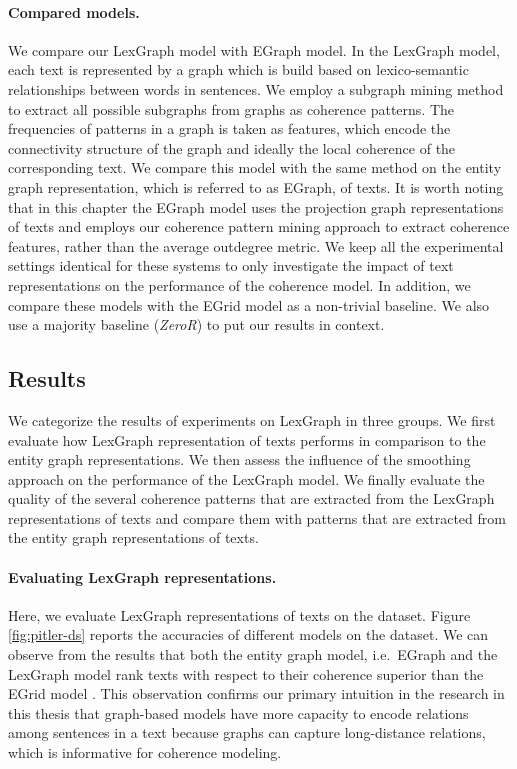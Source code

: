 \paragraph{Compared models.}
We compare our LexGraph model with EGraph model.
In the LexGraph model, each text is represented by a graph which is build based on lexico-semantic relationships between words in sentences.  
We employ a subgraph mining method to extract all possible subgraphs from graphs as coherence patterns. 
The frequencies of patterns in a graph is taken as features, which encode the connectivity structure of the graph and ideally the local coherence of the corresponding text. 
We compare this model with the same method on the entity graph representation, which is referred to as EGraph, of texts. 
It is worth noting that in this chapter the EGraph model uses the projection graph representations of texts and employs our coherence pattern mining approach to extract coherence features, rather than the average outdegree metric. 
We keep all the experimental settings identical for these systems to only investigate the impact of  text representations on the performance of the coherence model. 
In addition, we compare these models with the EGrid model \cite{barzilay08} as a non-trivial baseline. 
We also use a majority baseline (\emph{ZeroR}) to put our results in context. 


\subsection{Results}
We categorize the results of experiments on LexGraph in three groups. 
We first evaluate how LexGraph representation of texts performs in comparison to the entity graph representations.  
We then assess the influence of the smoothing approach on the performance of the LexGraph model. 
We finally evaluate the quality of the several coherence patterns that are extracted from the LexGraph representations of texts and compare them with patterns that are extracted from the entity graph representations of texts. 

\paragraph{Evaluating LexGraph representations.} 
Here, we evaluate LexGraph representations of texts on the \pitlerds dataset. 
Figure \ref{fig:pitler-ds} reports the accuracies of different models on the \pitlerds dataset. 
We can observe from the results that both the entity graph model, i.e.\ EGraph and the LexGraph model rank texts with respect to their coherence superior than the EGrid model \cite{barzilay08}.  
This observation confirms our primary intuition in the research in this thesis that graph-based models have more capacity to encode relations among sentences in a text because graphs can capture long-distance relations, which is informative for coherence modeling.  

